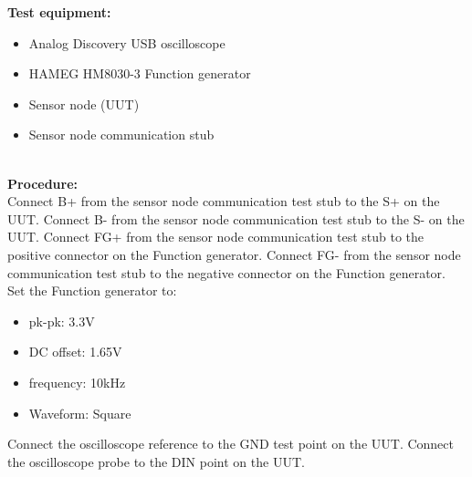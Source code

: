 \textbf{Test equipment:}
\begin{itemize}
\item Analog Discovery USB oscilloscope
\item HAMEG HM8030-3 Function generator
\item Sensor node (UUT)
\item Sensor node communication stub
\end{itemize}
\ \\
\textbf{Procedure:}\\
Connect B+ from the sensor node communication test stub to the S+ on the UUT. Connect B- from the sensor node communication test stub to the S- on the UUT.
Connect FG+ from the sensor node communication test stub to the positive connector on the Function generator. Connect FG- from the sensor node communication test stub to the negative connector on the Function generator.\\ Set the Function generator to:
\begin{itemize}
\item pk-pk: 3.3V
\item DC offset: 1.65V
\item frequency: 10kHz
\item Waveform: Square
\end{itemize}
Connect the oscilloscope reference to the GND test point on the UUT.
Connect the oscilloscope probe to the DIN point on the UUT.\\
\begin{figure}[H]
	\centering
\end{figure}

